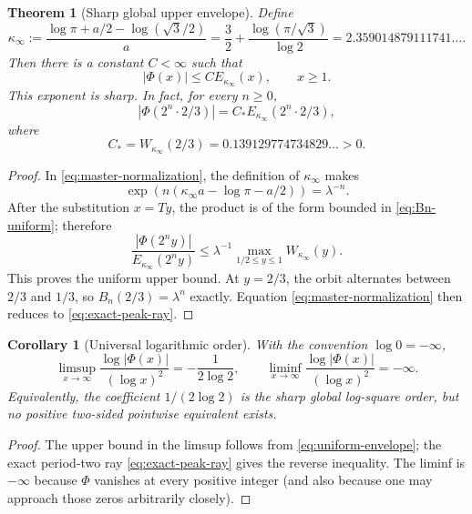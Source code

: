 \documentclass[11pt,oneside]{article}
\newtheorem{theorem}{Theorem}[section]
\newtheorem{corollary}[corollary]{Corollary}
\theoremstyle{definition}
\theoremstyle{remark}
\newcommand{\Phiup}{\Phi}
\newcommand{\abs}[1]{\left|#1\right|}
\begin{document}
\begin{theorem}[Sharp global upper envelope]
\label{thm:uniform-envelope}
Define
\begin{equation}
 \boxed{\displaystyle
 \kappa_\infty
 :=\frac{\log\pi+a/2-\log(\sqrt3/2)}{a}
 =\frac32+\frac{\log(\pi/\sqrt3)}{\log2}
 =2.359014879111741\ldots .}
 \label{eq:kappa-infty}
\end{equation}
Then there is a constant $C<\infty$ such that
\begin{equation}
 \abs{\Phiup(x)}\le C E_{\kappa_\infty}(x),
 \qquad x\ge1.
 \label{eq:uniform-envelope}
\end{equation}
This exponent is sharp.  In fact, for every $n\ge0$,
\begin{equation}
 \abs{\Phiup(2^n\cdot2/3)}
 =C_*E_{\kappa_\infty}(2^n\cdot2/3),
 \label{eq:exact-peak-ray}
\end{equation}
where
\begin{equation}
 C_*=W_{\kappa_\infty}(2/3)
 =0.139129774734829\ldots>0.
 \label{eq:Cstar}
\end{equation}
\end{theorem}

\begin{proof}
In \eqref{eq:master-normalization}, the definition of $\kappa_\infty$ makes
\[
 \exp(n(\kappa_\infty a-\log\pi-a/2))=\lambda^{-n}.
\]
After the substitution $x=Ty$, the product is of the form bounded in
\eqref{eq:Bn-uniform}; therefore
\[
 \frac{\abs{\Phiup(2^ny)}}{E_{\kappa_\infty}(2^ny)}
 \le\lambda^{-1}\max_{1/2\le y\le1}W_{\kappa_\infty}(y).
\]
This proves the uniform upper bound.  At $y=2/3$, the orbit alternates between $2/3$ and
$1/3$, so $B_n(2/3)=\lambda^n$ exactly.  Equation
\eqref{eq:master-normalization} then reduces to \eqref{eq:exact-peak-ray}.
\end{proof}

\begin{corollary}[Universal logarithmic order]
\label{cor:universal-log-order}
With the convention $\log0=-\infty$,
\begin{equation}
 \limsup_{x\to\infty}\frac{\log|\Phiup(x)|}{(\log x)^2}
 =-\frac1{2\log2},
 \qquad
 \liminf_{x\to\infty}\frac{\log|\Phiup(x)|}{(\log x)^2}=-\infty.
 \label{eq:universal-log-order}
\end{equation}
Equivalently, the coefficient $1/(2\log2)$ is the sharp global log-square order, but no
positive two-sided pointwise equivalent exists.
\end{corollary}

\begin{proof}
The upper bound in the limsup follows from \eqref{eq:uniform-envelope}; the exact period-two
ray \eqref{eq:exact-peak-ray} gives the reverse inequality.  The liminf is $-\infty$ because
$\Phiup$ vanishes at every positive integer (and also because one may approach those zeros
arbitrarily closely).
\end{proof}
\end{document}
